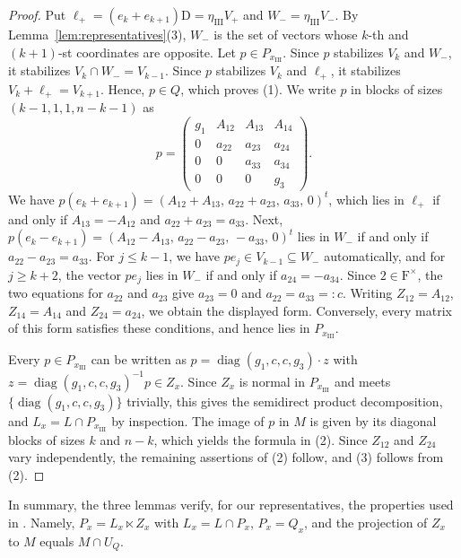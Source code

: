 \documentclass[11pt]{amsart}
\numberwithin{equation}{section}
\theoremstyle{plain}
\theoremstyle{definition}
\theoremstyle{remark}
\DeclareMathOperator{\diag}{diag}
\begin{document}
\begin{proof}
	Put $\ell_+=(e_k+e_{k+1})\mathrm{D}=\eta_{\mathrm{III}}V_+$ and $W_-=\eta_{\mathrm{III}}V_-$. By Lemma~\ref{lem:representatives}(3), $W_-$ is the set of vectors whose $k$-th and $(k+1)$-st coordinates are opposite. Let $p\in P_{x_{\mathrm{III}}}$. Since $p$ stabilizes $V_k$ and $W_-$, it stabilizes $V_k\cap W_-=V_{k-1}$. Since $p$ stabilizes $V_k$ and $\ell_+$, it stabilizes $V_k+\ell_+=V_{k+1}$. Hence, $p\in Q$, which proves (1). We write $p$ in blocks of sizes $(k-1,1,1,n-k-1)$ as
	$$
	p=\begin{pmatrix}g_1&A_{12}&A_{13}&A_{14}\\0&a_{22}&a_{23}&a_{24}\\0&0&a_{33}&a_{34}\\0&0&0&g_3\end{pmatrix}.
	$$
	We have $p(e_k+e_{k+1})=(A_{12}+A_{13},\,a_{22}+a_{23},\,a_{33},\,0)^t$, which lies in $\ell_+$ if and only if $A_{13}=-A_{12}$ and $a_{22}+a_{23}=a_{33}$. Next, $p(e_k-e_{k+1})=(A_{12}-A_{13},\,a_{22}-a_{23},\,-a_{33},\,0)^t$ lies in $W_-$ if and only if $a_{22}-a_{23}=a_{33}$. For $j\le k-1$, we have $pe_j\in V_{k-1}\subseteq W_-$ automatically, and for $j\ge k+2$, the vector $pe_j$ lies in $W_-$ if and only if $a_{24}=-a_{34}$. Since $2\in\mathrm{F}^\times$, the two equations for $a_{22}$ and $a_{23}$ give $a_{23}=0$ and $a_{22}=a_{33}=:c$. Writing $Z_{12}=A_{12}$, $Z_{14}=A_{14}$ and $Z_{24}=a_{24}$, we obtain the displayed form. Conversely, every matrix of this form satisfies these conditions, and hence lies in $P_{x_{\mathrm{III}}}$.
	
	Every $p\in P_{x_{\mathrm{III}}}$ can be written as $p=\diag(g_1,c,c,g_3)\cdot z$ with $z=\diag(g_1,c,c,g_3)^{-1}p\in Z_x$. Since $Z_x$ is normal in $P_{x_{\mathrm{III}}}$ and meets $\{\diag(g_1,c,c,g_3)\}$ trivially, this gives the semidirect product decomposition, and $L_x=L\cap P_{x_{\mathrm{III}}}$ by inspection. The image of $p$ in $M$ is given by its diagonal blocks of sizes $k$ and $n-k$, which yields the formula in (2). Since $Z_{12}$ and $Z_{24}$ vary independently, the remaining assertions of (2) follow, and (3) follows from (2).
\end{proof}

In summary, the three lemmas verify, for our representatives, the properties used in \cite[Lemmas 3.2, 3.3 and the proof of Proposition 4.1]{Off17}. Namely, $P_x=L_x\ltimes Z_x$ with $L_x=L\cap P_x$, $P_x=Q_x$, and the projection of $Z_x$ to $M$ equals $M\cap U_Q$.
\end{document}
